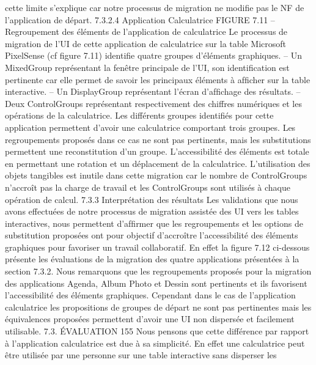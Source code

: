 \documentclass{article}
\begin{document}
cette limite s’explique car notre processus de migration ne modiﬁe pas le NF de l’application de
d\'{e}part.
7.3.2.4
Application Calculatrice
FIGURE 7.11 – Regroupement des \'{e}l\'{e}ments de l’application de calculatrice
Le processus de migration de l’UI de cette application de calculatrice sur la table Microsoft PixelSense (cf ﬁgure 7.11) identiﬁe quatre groupes d’\'{e}l\'{e}ments graphiques.
– Un MixedGroup repr\'{e}sentant la fen\^{e}tre principale de l’UI, son identiﬁcation est pertinente car
elle permet de savoir les principaux \'{e}l\'{e}ments \`{a} afﬁcher sur la table interactive.
– Un DisplayGroup repr\'{e}sentant l’\'{e}cran d’afﬁchage des r\'{e}sultats.
– Deux ControlGroups repr\'{e}sentant respectivement des chiffres num\'{e}riques et les op\'{e}rations de
la calculatrice.
Les diff\'{e}rents groupes identiﬁ\'{e}s pour cette application permettent d’avoir une calculatrice comportant trois groupes. Les regroupements propos\'{e}s dans ce cas ne sont pas pertinents, mais les substitutions permettent une reconstitution d’un groupe. L’accessibilit\'{e} des \'{e}l\'{e}ments est totale en permettant
une rotation et un d\'{e}placement de la calculatrice. L’utilisation des objets tangibles est inutile dans cette
migration car le nombre de ControlGroups n’accro\^{i}t pas la charge de travail et les ControlGroups sont
utilis\'{e}s \`{a} chaque op\'{e}ration de calcul.
7.3.3
Interpr\'{e}tation des r\'{e}sultats
Les validations que nous avons effectu\'{e}es de notre processus de migration assist\'{e}e des UI vers
les tables interactives, nous permettent d’afﬁrmer que les regroupements et les options de substitution
propos\'{e}es ont pour objectif d’accro\^{i}tre l’accessibilit\'{e} des \'{e}l\'{e}ments graphiques pour favoriser un travail
collaboratif.
En effet la ﬁgure 7.12 ci-dessous pr\'{e}sente les \'{e}valuations de la migration des quatre applications
pr\'{e}sent\'{e}es \`{a} la section 7.3.2. Nous remarquons que les regroupements propos\'{e}s pour la migration
des applications Agenda, Album Photo et Dessin sont pertinents et ils favorisent l’accessibilit\'{e} des
\'{e}l\'{e}ments graphiques. Cependant dans le cas de l’application calculatrice les propositions de groupes
de d\'{e}part ne sont pas pertinentes mais les \'{e}quivalences propos\'{e}es permettent d’avoir une UI non
dispers\'{e}e et facilement utilisable.
7.3. ÉVALUATION
155
Nous pensons que cette diff\'{e}rence par rapport \`{a} l’application calculatrice est due \`{a} sa simplicit\'{e}.
En effet une calculatrice peut \^{e}tre utilis\'{e}e par une personne sur une table interactive sans disperser les
\end{document}
